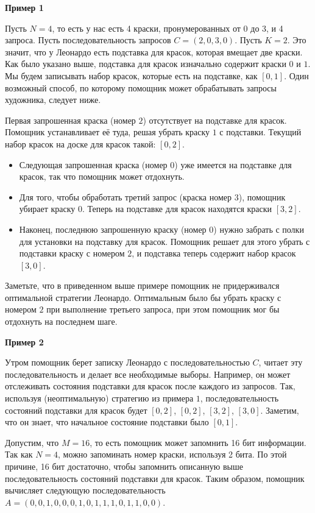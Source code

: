 \bf{Пример 1}

Пусть $N = 4$, то есть у нас есть 4 краски, пронумерованных от $0$ до $3$, и 4 запроса. Пусть последовательность запросов $C = (2, 0, 3, 0).$ Пусть $K = 2$. Это значит, что у Леонардо есть подставка для красок, которая вмещает две краски. Как было указано выше, подставка для красок изначально содержит краски $0$ и $1$. Мы будем записывать набор красок, которые есть на подставке, как $[0, 1]$. Один возможный способ, по которому помощник может обрабатывать запросы художника, следует ниже.

Первая запрошенная краска (номер $2$) отсутствует на подставке для красок. Помощник устанавливает её туда, решая убрать краску $1$ с подставки. Текущий набор красок на доске для красок такой: $[0, 2]$.

\begin{itemize}

\item Следующая запрошенная краска (номер $0$) уже имеется на подставке для красок, так что помощник может отдохнуть.

\item Для того, чтобы обработать третий запрос (краска номер $3$), помощник убирает краску $0$. Теперь на подставке для красок находятся краски $[3, 2]$.

\item Наконец, последнюю запрошенную краску (номер $0$) нужно забрать с полки для установки на подставку для красок. Помощник решает для этого убрать с подставки краску с номером $2$, и подставка теперь содержит набор красок $[3, 0]$.

\end{itemize}

Заметьте, что в приведенном выше примере помощник не придерживался оптимальной стратегии Леонардо. Оптимальным было бы убрать краску с номером $2$ при выполнение третьего запроса, при этом помощник мог бы отдохнуть на последнем шаге. 

\bf{Пример 2}

Утром помощник берет записку Леонардо с последовательностью $C$, читает эту последовательность и делает все необходимые выборы. Например, он может отслеживать состояния подставки для красок после каждого из запросов. Так, используя (неоптимальную) стратегию из примера $1$, последовательность состояний подставки для красок будет $[0, 2]$, $[0, 2]$, $[3, 2]$, $[3, 0]$. Заметим, что он знает, что начальное состояние подставки было $[0, 1]$.

Допустим, что $M = 16$, то есть помощник может запомнить 16 бит информации. Так как $N = 4$, можно запоминать номер краски, используя 2 бита. По этой причине, 16 бит достаточно, чтобы запомнить описанную выше последовательность состояний подставки для красок. Таким образом, помощник вычисляет следующую последовательность $A = (0, 0, 1, 0, 0, 0, 1, 0, 1, 1, 1, 0, 1, 1, 0, 0)$.

